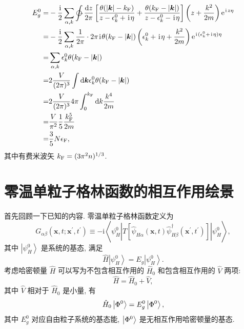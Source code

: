   \begin{align}
        E_g^0=&-\frac{\ii}{2}\sum_{\alpha,k}\ointctrclockwise\frac{\dd z}{2\pi}\lmi \frac{\theta(|\vct{k}|-k_{\fun{F}})}{z-\epsilon_k^0+\ii\eta}+\frac{\theta(k_{\fun{F}}-|\vct{k}|)}{z-\epsilon_k^0-\ii\eta} \rmi \ls z+\frac{k^2}{2m} \rs \e^{\ii z\eta}\nonumber\\
        =&-\frac{\ii}{2}\sum_{\alpha,k}\frac{1}{2\pi}\cdot2\pi\ii\theta(k_{\fun{F}}-|\vct{k}|)\ls \epsilon_k^0+\ii\eta+\frac{k^2}{2m} \rs\e^{\ii(\epsilon_k^0+\ii\eta)\eta}\nonumber\\
        =&\sum_{\alpha,k}\epsilon_k^0\theta(k_{\fun{F}}-|\vct{k}|)\nonumber\\
        =&2\frac{V}{(2\pi)^3}\int\dd\vct{k}\epsilon_k^0\theta(k_{\fun{F}}-|\vct{k}|)\nonumber\\
        =&2\frac{V}{(2\pi)^3}4\pi\int_0^{k_{\fun{F}}}\dd k\frac{k^4}{2m}\nonumber\\
        =&\frac{V}{\pi^2}\frac{1}{5}\frac{k_{\fun{F}}^5}{2m}\nonumber\\
        =&\frac{3}{5}N\epsilon_{\fun{F}},
    \end{align}
其中有费米波矢 $k_{\mathrm{F}}=(3\pi^2n)^{1/3}$.

\section{零温单粒子格林函数的相互作用绘景}
首先回顾一下已知的内容. 零温单粒子格林函数定义为
\begin{equation}
G_{\alpha \beta}\left(\boldsymbol{x}, t ; \boldsymbol{x}^{\prime}, t^{\prime}\right) \equiv-\mathrm{i}\left\langle\psi_{H}^{0}\left|\hat{T}\left[\hat{\psi}^{}_{H \alpha}(\boldsymbol{x}, t) \hat{\psi}_{H \beta}^{\dagger}\left(\boldsymbol{x}^{\prime}, t^{\prime}\right)\right]\right| \psi_{H}^{0}\right\rangle ,
\end{equation}
其中 $\left| \psi_{H}^{0}\right\rangle$ 是系统的基态, 满足
\begin{equation}
\hat{H}\left|\psi_{H}^{0}\right\rangle=E_{g}\left|\psi_{H}^{0}\right\rangle .
\end{equation}
考虑哈密顿量 $\hat H$ 可以写为不包含相互作用的 $\hat{H}_0$ 和包含相互作用的 $\hat V$ 两项:
\begin{equation}
\hat H=\hat{H}_0+\hat{V},
\end{equation}
其中 $\hat{V}$ 相对于 $\hat{H}_0$ 是小量, 有
\begin{equation}
\hat{H}_0 \left|\Phi^0\right\rangle = E_g^0 \left|\Phi^0\right\rangle,
\end{equation}
其中 $E_g^0$ 对应自由粒子系统的基态能, $\left|\Phi^0\right\rangle$ 是无相互作用哈密顿量的基态.

